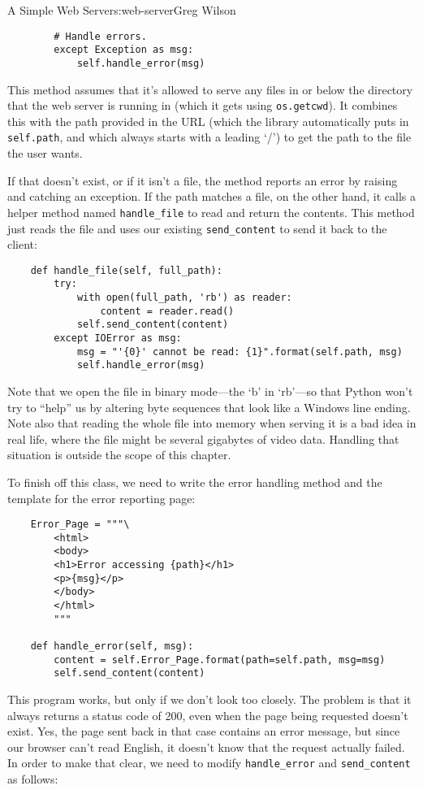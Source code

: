 \begin{aosachapter}{A Simple Web Server}{s:web-server}{Greg Wilson}
\begin{verbatim}
        # Handle errors.
        except Exception as msg:
            self.handle_error(msg)
\end{verbatim}

This method assumes that it's allowed to serve any files in or below the
directory that the web server is running in (which it gets using
\texttt{os.getcwd}). It combines this with the path provided in the URL
(which the library automatically puts in \texttt{self.path}, and which
always starts with a leading `/') to get the path to the file the user
wants.

If that doesn't exist, or if it isn't a file, the method reports an
error by raising and catching an exception. If the path matches a file,
on the other hand, it calls a helper method named \texttt{handle\_file}
to read and return the contents. This method just reads the file and
uses our existing \texttt{send\_content} to send it back to the client:

\begin{verbatim}
    def handle_file(self, full_path):
        try:
            with open(full_path, 'rb') as reader:
                content = reader.read()
            self.send_content(content)
        except IOError as msg:
            msg = "'{0}' cannot be read: {1}".format(self.path, msg)
            self.handle_error(msg)
\end{verbatim}

Note that we open the file in binary mode---the `b' in `rb'---so that
Python won't try to ``help'' us by altering byte sequences that look
like a Windows line ending. Note also that reading the whole file into
memory when serving it is a bad idea in real life, where the file might
be several gigabytes of video data. Handling that situation is outside
the scope of this chapter.

To finish off this class, we need to write the error handling method and
the template for the error reporting page:

\begin{verbatim}
    Error_Page = """\
        <html>
        <body>
        <h1>Error accessing {path}</h1>
        <p>{msg}</p>
        </body>
        </html>
        """

    def handle_error(self, msg):
        content = self.Error_Page.format(path=self.path, msg=msg)
        self.send_content(content)
\end{verbatim}

This program works, but only if we don't look too closely. The problem
is that it always returns a status code of 200, even when the page being
requested doesn't exist. Yes, the page sent back in that case contains
an error message, but since our browser can't read English, it doesn't
know that the request actually failed. In order to make that clear, we
need to modify \texttt{handle\_error} and \texttt{send\_content} as
follows:


\end{aosachapter}
